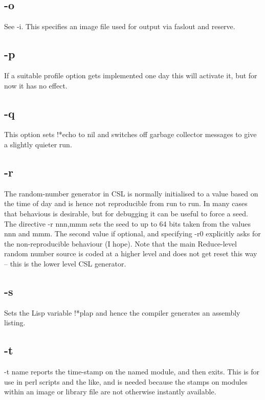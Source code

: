 \documentclass[a4paper,11pt]{article}
\begin{document}
\subsection{\ttfamily -o}
See {\ttfamily -i}. This specifies an image file used for output via
{\ttfamily faslout} and {\ttfamily reserve}.

\subsection{\ttfamily -p}
If a suitable profile option gets implemented one day this will activate it,
but for now it has no effect.

\subsection{\ttfamily -q}
This option sets {\ttfamily !*echo} to {\ttfamily nil} and switches off
garbage collector messages to give a slightly quieter run.

\subsection{\ttfamily -r}
The random-number generator in CSL is normally initialised to a value
based on the time of day and is hence not reproducible from run to run.
In many cases that behavious is desirable, but for debugging it can be useful
to force a seed. The directive {\ttfamily -r nnn,mmm} sets the seed to
up to 64 bits taken from the values nnn and mmm. The second value if optional,
and specifying {\ttfamily -r0}  explicitly asks for the non-reproducible
behaviour (I hope). Note that the main Reduce-level random number source is
coded at a higher level and does not get reset this way -- this is the
lower level CSL generator.

\subsection{\ttfamily -s}
Sets the Lisp variable {\ttfamily !*plap} and hence the compiler generates
an assembly listing.

\subsection{\ttfamily -t}
{\ttfamily -t name} reports the time-stamp on the named module, and then
exits. This is for use in perl scripts and the like, and is
needed because the stamps on modules within an image or
library file are not otherwise instantly available.
  
\end{document}

